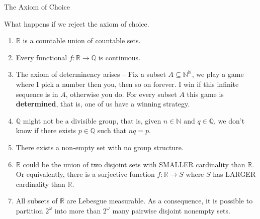 \documentclass[9pt]{beamer}
\begin{document}
    \begin{frame}{The Axiom of Choice}

        What happens if we reject the axiom of choice.

        \begin{enumerate}
            \item $\mathbb{R}$ is a countable union of countable sets.\pause
            \item Every functional $f:\mathbb{R}\rightarrow\mathbb{Q}$ is continuous.\pause
            \item The axiom of determinency arises -- Fix a subset $A\subseteq\mathbb{N}^\mathbb{N}$, we play a game where I pick a number then you, then so on forever.
            I win if this infinite sequence is in $A$, otherwise you do.
            For every subset $A$ this game is \textbf{determined}, that is, one of us have a winning strategy.\pause
            \item $\mathbb{Q}$ might not be a divisible group, that is, given $n\in\mathbb{N}$ and $q\in\mathbb{Q}$, we don't know if there exists $p\in\mathbb{Q}$ such that $nq=p$.\pause
            \item There exists a non-empty set with no group structure.\pause
            \item $\mathbb{R}$ could be the union of two disjoint sets with SMALLER cardinality than $\mathbb{R}$.
            Or equivalently, there is a surjective function $f:\mathbb{R}\rightarrow S$ where $S$ has LARGER cardinality than $\mathbb{R}$.\pause
            \item All subsets of $\mathbb{R}$ are Lebesgue measurable.
            As a consequence, it is possible to partition $2^\omega$ into more than $2^\omega$ many pairwise disjoint nonempty sets.
        \end{enumerate}

    \end{frame}
\end{document}

